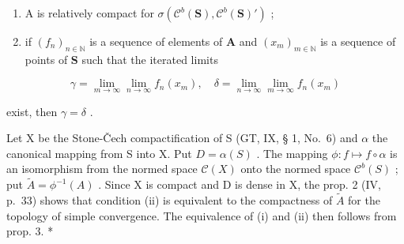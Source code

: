 \begin{enumerate}
\def\labelenumi{(\roman{enumi})}
\item
  A is relatively compact for \(\sigma(\mathcal{C}^b(\mathbf{S}),\mathcal{C}^b(\mathbf{S})')\) ;
\item
  if \((f_n)_{n\in \mathbb{N}}\) is a sequence of elements of \(\mathbf{A}\) and \((x_m)_{m\in \mathbb{N}}\) is a sequence of points of \(\mathbf{S}\) such that the iterated limits
\end{enumerate}

\[
\gamma = \lim _ {m \rightarrow \infty} \lim _ {n \rightarrow \infty} f _ {n} (x _ {m}), \quad \delta = \lim _ {n \rightarrow \infty} \lim _ {m \rightarrow \infty} f _ {n} (x _ {m})
\]

exist, then \(\gamma = \delta\) .

Let X be the Stone-Čech compactification of S (GT, IX, § 1, No.~6) and \(\alpha\) the canonical mapping from S into X. Put \(D = \alpha(S)\) . The mapping \(\phi: f \mapsto f \circ \alpha\) is an isomorphism from the normed space \(\mathcal{C}(X)\) onto the normed space \(\mathcal{C}^b(S)\) ; put \(\tilde{A} = \phi^{-1}(A)\) . Since X is compact and D is dense in X, the prop. 2 (IV, p.~33) shows that condition (ii) is equivalent to the compactness of \(\tilde{A}\) for the topology of simple convergence. The equivalence of (i) and (ii) then follows from prop. 3. *

